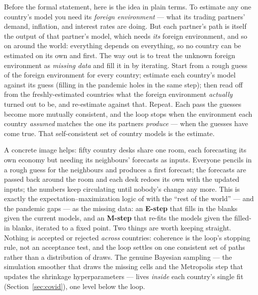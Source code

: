 \documentclass[11pt]{article}
\theoremstyle{plain}
\theoremstyle{remark}
\begin{document}
Before the formal statement, here is the idea in plain terms. To estimate
any one country's model you need its \emph{foreign environment} --- what
its trading partners' demand, inflation, and interest rates are doing. But
each partner's path is itself the output of that partner's model, which
needs \emph{its} foreign environment, and so on around the world:
everything depends on everything, so no country can be estimated on its
own and first. The way out is to treat the unknown foreign environment as
\emph{missing data} and fill it in by iterating. Start from a rough guess
of the foreign environment for every country; estimate each country's
model against its guess (filling in the pandemic holes in the same step);
then read off from the freshly-estimated countries what the foreign
environment \emph{actually} turned out to be, and re-estimate against
that. Repeat. Each pass the guesses become more mutually consistent, and
the loop stops when the environment each country \emph{assumed} matches
the one its partners \emph{produce} --- when the guesses have come true.
That self-consistent set of country models is the estimate.

A concrete image helps: fifty country desks share one room, each
forecasting its own economy but needing its neighbours' forecasts as
inputs. Everyone pencils in a rough guess for the neighbours and produces
a first forecast; the forecasts are passed back around the room and each
desk redoes its own with the updated inputs; the numbers keep circulating
until nobody's change any more. This is exactly the
expectation--maximization logic of \citet{DempsterLairdRubin1977} with the
``rest of the world'' --- and the pandemic gaps --- as the missing data:
an \textbf{E-step} that fills in the blanks given the current models, and
an \textbf{M-step} that re-fits the models given the filled-in blanks,
iterated to a fixed point. Two things are worth keeping straight. Nothing
is accepted or rejected \emph{across} countries: coherence is the loop's
stopping rule, not an acceptance test, and the loop settles on one
consistent set of paths rather than a distribution of draws. The genuine
Bayesian sampling --- the simulation smoother that draws the missing cells
and the Metropolis step that updates the shrinkage hyperparameters ---
lives \emph{inside} each country's single fit (Section~\ref{sec:covid}),
one level below the loop.
\end{document}

